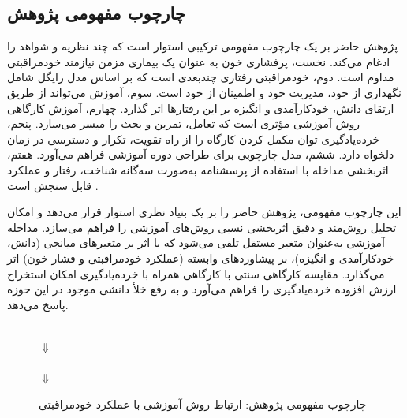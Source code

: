 \subsection{چارچوب مفهومی پژوهش}
پژوهش حاضر بر یک چارچوب مفهومی ترکیبی استوار است که چند نظریه و شواهد را ادغام می‌کند. نخست، پرفشاری خون به عنوان یک بیماری مزمن نیازمند خودمراقبتی مداوم است. دوم، خودمراقبتی رفتاری چندبعدی است که بر اساس مدل رایگل شامل نگهداری از خود، مدیریت خود و اطمینان از خود است. سوم، آموزش می‌تواند از طریق ارتقای دانش، خودکارآمدی و انگیزه بر این رفتارها اثر گذارد. چهارم، آموزش کارگاهی روش آموزشی مؤثری است که تعامل، تمرین و بحث را میسر می‌سازد. پنجم، خرده‌یادگیری توان مکمل کردن کارگاه را از راه تقویت، تکرار و دسترسی در زمان دلخواه دارد. ششم، مدل  چارچوبی برای طراحی دوره آموزشی فراهم می‌آورد. هفتم، اثربخشی مداخله با استفاده از پرسشنامه  به‌صورت سه‌گانه شناخت، رفتار و عملکرد قابل سنجش است \cite{riegel2012middlerange,branch2009addie,han2014hscp}.
\par
این چارچوب مفهومی، پژوهش حاضر را بر یک بنیاد نظری استوار قرار می‌دهد و امکان تحلیل روش‌مند و دقیق اثربخشی نسبی روش‌های آموزشی را فراهم می‌سازد. مداخله آموزشی به‌عنوان متغیر مستقل تلقی می‌شود که با اثر بر متغیرهای میانجی (دانش، خودکارآمدی و انگیزه)، بر پیشاوردهای وابسته (عملکرد خودمراقبتی و فشار خون) اثر می‌گذارد. مقایسه کارگاهی سنتی با کارگاهی همراه با خرده‌یادگیری امکان استخراج ارزش افزوده خرده‌یادگیری را فراهم می‌آورد و به رفع خلأ دانشی موجود در این حوزه پاسخ می‌دهد.

\begin{figure}[H]
  \centering
  \begin{minipage}{0.88\textwidth}
    \centering
    \\[0.45em]
    $\Downarrow$\\[0.45em]
    \\[0.45em]
    $\Downarrow$\\[0.45em]
  \end{minipage}
  \caption{چارچوب مفهومی پژوهش: ارتباط روش آموزشی با عملکرد خودمراقبتی}
  \label{fig:conceptual-framework}
\end{figure}

